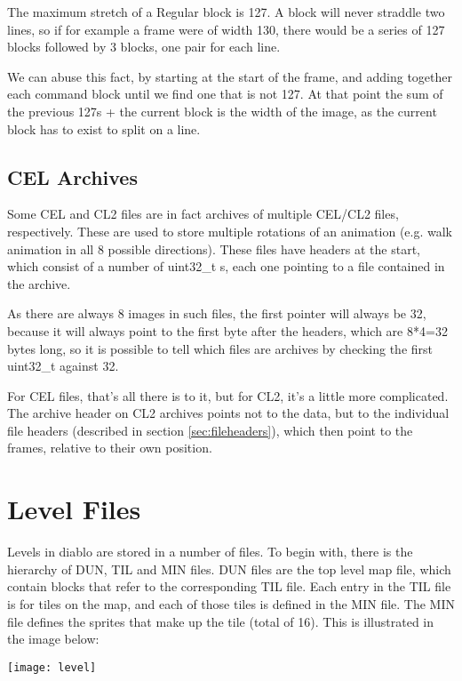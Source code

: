  	The maximum stretch of a Regular block is 127. A block will never straddle two lines, so if for example a frame were of width 130, there would be a series of 127 blocks followed by 3 blocks, one pair for each line.
 	
 	We can abuse this fact, by starting at the start of the frame, and adding together each command block until we find one that is not 127. At that point the sum of the previous 127s + the current block is the width of the image, as the current block has to exist to split on a line.
 	
 	\subsection{CEL Archives}
 	Some CEL and CL2 files are in fact archives of multiple CEL/CL2 files, respectively. These are used to store multiple rotations of an animation (e.g. walk animation in all 8 possible directions). These files have headers at the start, which consist of a number of uint32\_t s, each one pointing to a file contained in the archive.
 	
 	As there are always 8 images in such files, the first pointer will always be 32, because it will always point to the first byte after the headers, which are 8*4=32 bytes long, so it is possible to tell which files are archives by checking the first uint32\_t against 32.
 	
 	For CEL files, that's all there is to it, but for CL2, it's a little more complicated. The archive header on CL2 archives points not to the data, but to the individual file headers (described in section \ref{sec:fileheaders}), which then point to the frames, relative to their own position.

\newpage

\section{Level Files}
    Levels in diablo are stored in a number of files. To begin with, there is the hierarchy of DUN, TIL and MIN files.
    DUN files are the top level map file, which contain blocks that refer to the corresponding TIL file. Each entry in the TIL file is for tiles on the map, and each of those tiles is defined in the MIN file. The MIN file defines the sprites that make up the tile (total of 16). This is illustrated in the image below:\\
    
    \begin{center}\texttt{[image: level]}\end{center}
    

